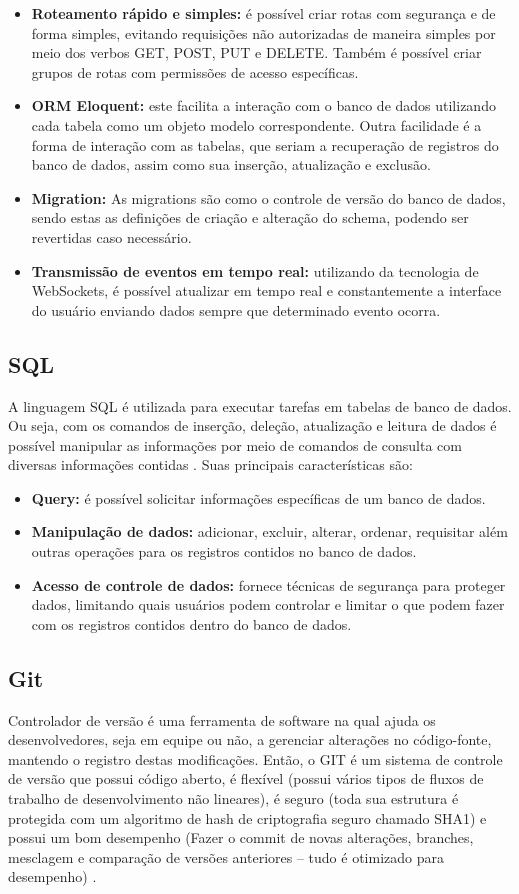 \begin{itemize}
    \item \textbf{Roteamento rápido e simples:} é possível criar rotas com segurança e de forma simples, evitando requisições não autorizadas de maneira simples por meio dos verbos GET, POST, PUT e DELETE. Também é possível criar grupos de rotas com permissões de acesso específicas.
    \item \textbf{ORM Eloquent:} este facilita a interação com o banco de dados utilizando cada tabela como um objeto modelo correspondente. Outra facilidade é a forma de interação com as tabelas, que seriam a recuperação de registros do banco de dados, assim como sua inserção, atualização e exclusão.
    \item \textbf{Migration:} As migrations são como o controle de versão do banco de dados, sendo estas as definições de criação e alteração do schema, podendo ser revertidas caso necessário.
    \item \textbf{Transmissão de eventos em tempo real:} utilizando da tecnologia de WebSockets, é possível atualizar em tempo real e constantemente a interface do usuário enviando dados sempre que determinado evento ocorra.
\end{itemize}

\subsection{SQL}
A linguagem SQL é utilizada para executar tarefas em tabelas de banco de dados. Ou seja, com os comandos de inserção, deleção, atualização e leitura de dados é possível manipular as informações por meio de comandos de consulta com diversas informações contidas \cite{HEUSER}. Suas principais características são:
\begin{itemize}
    \item \textbf{Query:} é possível solicitar informações específicas de um banco de dados.
    \item \textbf{Manipulação de dados:} adicionar, excluir, alterar, ordenar, requisitar além outras operações para os registros contidos no banco de dados.
    \item \textbf{Acesso de controle de dados:} fornece técnicas de segurança para proteger dados, limitando quais usuários podem controlar e limitar o que podem fazer com os registros contidos dentro do banco de dados.
\end{itemize}
\subsection{Git}
Controlador de versão é uma ferramenta de software na qual ajuda os desenvolvedores, seja em equipe ou não, a gerenciar alterações no código-fonte, mantendo o registro destas modificações. Então, o GIT é um sistema de controle de versão que possui código aberto, é flexível (possui vários tipos de fluxos de trabalho de desenvolvimento não lineares), é seguro (toda sua estrutura é protegida com um algoritmo de hash de criptografia seguro chamado SHA1) e possui um bom desempenho (Fazer o commit de novas alterações, branches, mesclagem e comparação de versões anteriores – tudo é otimizado para desempenho) \cite{SANTACROCE}.

